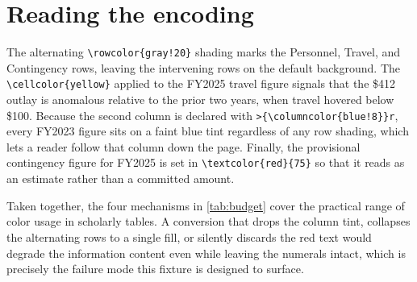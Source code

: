 \documentclass[11pt]{article}
\begin{document}
\section{Reading the encoding}

The alternating \verb|\rowcolor{gray!20}| shading marks the Personnel, Travel,
and Contingency rows, leaving the intervening rows on the default background. The
\verb|\cellcolor{yellow}| applied to the FY2025 travel figure signals that the
\$412 outlay is anomalous relative to the prior two years, when travel hovered
below \$100. Because the second column is declared with
\verb|>{\columncolor{blue!8}}r|, every FY2023 figure sits on a faint blue tint
regardless of any row shading, which lets a reader follow that column down the
page. Finally, the provisional contingency figure for FY2025 is set in
\verb|\textcolor{red}{75}| so that it reads as an estimate rather than a
committed amount.

Taken together, the four mechanisms in \cref{tab:budget} cover the practical
range of color usage in scholarly tables. A conversion that drops the column
tint, collapses the alternating rows to a single fill, or silently discards the
red text would degrade the information content even while leaving the numerals
intact, which is precisely the failure mode this fixture is designed to surface.
\end{document}
